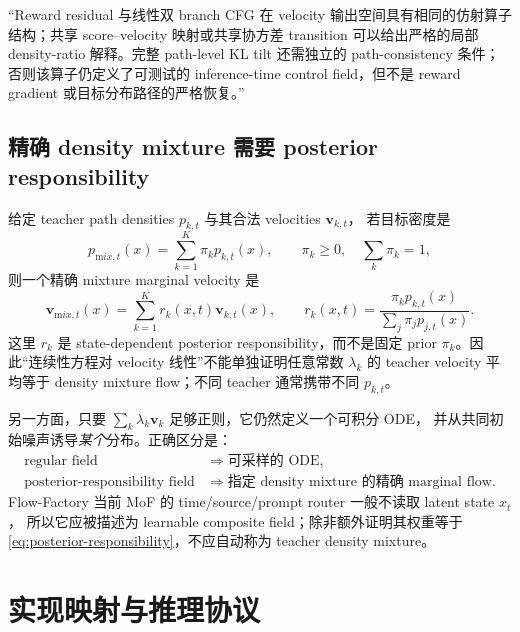 \documentclass[11pt,a4paper]{article}
\newcommand{\vfield}{\bm{v}}
\theoremstyle{definition}
\theoremstyle{plain}
\begin{document}
\begin{tcolorbox}[
  colback=yellow!5,
  colframe=yellow!50!black,
  title=推荐表述]
``Reward residual 与线性双 branch CFG 在 velocity 输出空间具有相同的仿射算子
结构；共享 score--velocity 映射或共享协方差 transition 可以给出严格的局部
density-ratio 解释。完整 path-level KL tilt 还需独立的 path-consistency 条件；
否则该算子仍定义了可测试的 inference-time control field，但不是 reward gradient
或目标分布路径的严格恢复。''
\end{tcolorbox}

\subsection{精确 density mixture 需要 posterior responsibility}

给定 teacher path densities $p_{k,t}$ 与其合法 velocities $\vfield_{k,t}$，
若目标密度是
\begin{equation}
  p_{\mathrm mix,t}(x)
  =
  \sum_{k=1}^{K}\pi_k p_{k,t}(x),
  \qquad
  \pi_k\ge0,\quad\sum_k\pi_k=1,
  \label{eq:density-mixture}
\end{equation}
则一个精确 mixture marginal velocity 是
\begin{equation}
\boxed{
  \vfield_{\mathrm mix,t}(x)
  =
  \sum_{k=1}^{K}
  r_k(x,t)\vfield_{k,t}(x),
  \qquad
  r_k(x,t)
  =
  \frac{\pi_kp_{k,t}(x)}
       {\sum_j\pi_jp_{j,t}(x)}.
}
\label{eq:posterior-responsibility}
\end{equation}
这里 $r_k$ 是 state-dependent posterior responsibility，而不是固定 prior
$\pi_k$。因此``连续性方程对 velocity 线性''不能单独证明任意常数
$\lambda_k$ 的 teacher velocity 平均等于 density mixture flow；不同 teacher
通常携带不同 $p_{k,t}$。

另一方面，只要 $\sum_k\lambda_k\vfield_k$ 足够正则，它仍然定义一个可积分 ODE，
并从共同初始噪声诱导\emph{某个}分布。正确区分是：
\begin{align}
  \text{regular field}
  &\Longrightarrow \text{可采样的 ODE},\nonumber\\
  \text{posterior-responsibility field}
  &\Longrightarrow \text{指定 density mixture 的精确 marginal flow}.
  \label{eq:validity-distinction}
\end{align}
Flow-Factory 当前 MoF 的 time/source/prompt router 一般不读取 latent state $x_t$，
所以它应被描述为 learnable composite field；除非额外证明其权重等于
\eqref{eq:posterior-responsibility}，不应自动称为 teacher density mixture。

\section{实现映射与推理协议}
\end{document}
